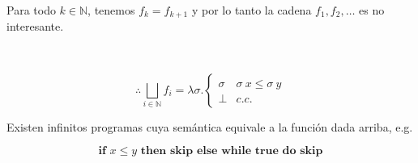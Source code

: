 \documentclass[a4paper, 12pt]{article}
\begin{document}
Para todo $k \in \mathbb{N}$, tenemos $f_k = f_{k+1}$ y por lo
tanto la cadena $f_1, f_2, \ldots$ es no interesante. 

~


\begin{equation*}
  \therefore \bigsqcup_{i \in \mathbb{N}} f_i = \lambda \sigma . \begin{cases}
    \sigma & \sigma ~ x \leq \sigma ~ y \\ 
    \bot  & c.c.
  \end{cases}
\end{equation*}

Existen infinitos programas cuya semántica equivale a la función dada arriba,
e.g.

\begin{equation*}
  \textbf{if } x \leq y \textbf{ then } \textbf{skip} \textbf{ else }
  \textbf{while true do skip} 
\end{equation*}
\end{document}

